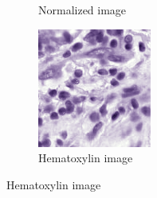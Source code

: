 \begin{figure}[H]
\begin{subfigure}[b]{0.32\textwidth}
    \caption{Normalized image}\label{fig:tiger-norm}
  \end{subfigure}\hfill
  \begin{subfigure}[b]{0.32\textwidth}
    \centering
    \includegraphics[width=\linewidth]{assets/images/for_presentation/hem_TCGA-EW-A1P8-01Z-00-DX1.E9852193-8CDD-49EF-B49B-DA6931198F0D_[8391, 13690, 8532, 13838].png}
    \caption{Hematoxylin image}\label{fig:tiger-hem}
  \end{subfigure}

  \par\vspace{1em}


\end{figure}
